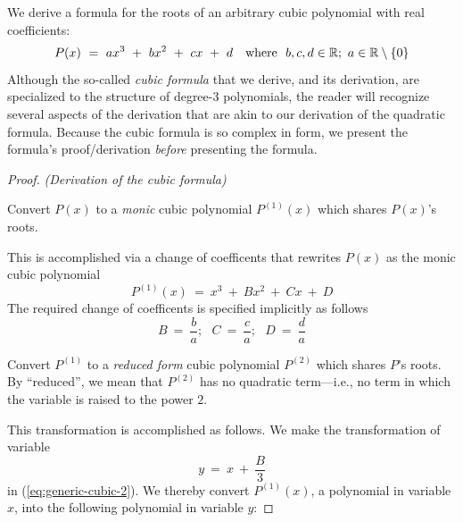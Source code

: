 We derive a formula for the roots of an arbitrary cubic polynomial
 with real coefficients:
\begin{equation}
\label{eq:generic-cubic-1}
P(x) \ = \  ax^3 \ + \ bx^2 \ + \ cx \ + \ d \ \ \mbox{  where  }
\ b,c, d  \in \mathbb{R};\ a \in \mathbb{R} \setminus \{0\}
\end{equation}
Although the so-called {\em cubic formula} that we derive, and its
derivation, are specialized to the structure of degree-$3$
polynomials, the reader will recognize several aspects of the
derivation that are akin to our derivation of the quadratic formula.
Because the cubic formula is so complex in form, we present the
formula's proof/derivation {\em before} presenting the formula.

\begin{proof} {\it (Derivation of the cubic formula)}

 Convert $P(x)$ to a {\em monic}
cubic polynomial $P^{(1)}(x)$ which shares $P(x)$'s roots.

\noindent
This is accomplished via a change of coefficents that rewrites $P(x)$
as the monic cubic polynomial
\begin{equation}
\label{eq:generic-cubic-2}
P^{(1)}(x) \ = \  x^3 \ + \ Bx^2 \ + \ Cx \ + \ D
\end{equation}
The required change of coefficents is specified implicitly as follows
\[
B \ = \ \frac{b}{a}; \ \ \
C \ = \ \frac{c}{a}; \ \ \
D \ = \ \frac{d}{a}
\]


\medskip

 Convert $P^{(1)}$ to a {\em reduced form}
cubic polynomial $P^{(2)}$ which shares $P$'s roots.  By
``reduced'', we mean that $P^{(2)}$ has no quadratic term---i.e., no
term in which the variable is raised to the power $2$.

\noindent
This transformation is accomplished as follows.  We make the
transformation of variable
\begin{equation}
\label{eq:cubic-substitute-y-for-x} 
y \ = \ x \ + \ \frac{B}{3}
\end{equation}
in (\ref{eq:generic-cubic-2}).  We thereby convert $P^{(1)}(x)$, a
polynomial in variable $x$, into the following polynomial in variable
$y$:


\end{proof}
